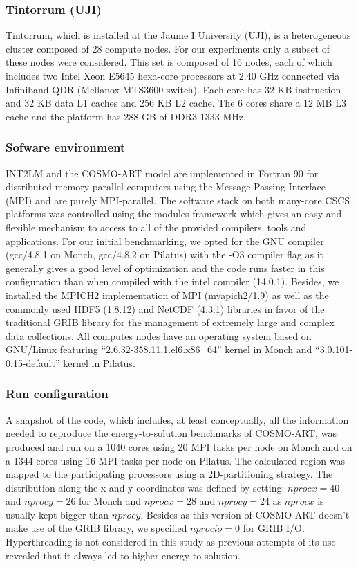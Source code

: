 \subsubsection{Tintorrum (UJI)}
Tintorrum, which  is installed at the  Jaume I University  (UJI), is a
heterogeneous  cluster   composed  of  28  compute   nodes.   For  our
experiments only a subset of  these nodes were considered. This set is
composed  of 16 nodes,  each of  which includes  two Intel  Xeon E5645
hexa-core  processors  at  2.40   GHz  connected  via  Infiniband  QDR
(Mellanox MTS3600 switch).  Each core  has 32 KB instruction and 32 KB
data L1 caches and 256 KB L2 cache. The 6 cores share a 12 MB L3 cache
and the platform has 288 GB of DDR3 1333 MHz.
 
\subsubsection{Sofware environment}
INT2LM  and the  COSMO-ART model  are  implemented in  Fortran 90  for
distributed  memory  parallel  computers  using  the  Message  Passing
Interface (MPI)  and are purely  MPI-parallel.  The software  stack on
both  many-core  CSCS  platforms  was  controlled  using  the  modules
framework which gives an easy  and flexible mechanism to access to all
of the  provided compilers, tools  and applications.  For  our initial
benchmarking,  we opted  for  the GNU  compiler  (gcc/4.8.1 on  Monch,
gcc/4.8.2 on Pilatus) with the -O3 compiler flag as it generally gives
a  good  level  of optimization  and  the  code  runs faster  in  this
configuration  than when  compiled with  the intel  compiler (14.0.1).
Besides, we installed the  MPICH2 implementation of MPI (mvapich2/1.9)
as  well  as  the  commonly  used HDF5  (1.8.12)  and  NetCDF  (4.3.1)
libraries in favor of the  traditional GRIB library for the management
of extremely  large and complex data collections.   All computes nodes
have    an   operating   system    based   on    GNU/Linux   featuring
``2.6.32-358.11.1.el6.x86\_64''      kernel      in     Monch      and
``3.0.101-0.15-default'' kernel in Pilatus.

\subsubsection{Run configuration}
A snapshot of the code, which includes, at least conceptually, all the
information needed  to reproduce the  energy-to-solution benchmarks of
COSMO-ART, was produced and run on a 1040 cores using 20 MPI tasks per
node on  Monch and  on a  1344 cores using  16 MPI  tasks per  node on
Pilatus.   The  calculated  region  was mapped  to  the  participating
processors using  a 2D-partitioning strategy.   The distribution along
the  x and  y  coordinates  was defined  by  setting: $nprocx=40$  and
$nprocy=26$ for  Monch and $nprocx=28$ and $nprocy=24$  as $nprocx$ is
usually  kept  bigger  than  $nprocy$.   Besides as  this  version  of
COSMO-ART  doesn't  make  use   of  the  GRIB  library,  we  specified
$nprocio=0$ for  GRIB I/O.  Hyperthreading  is not considered  in this
study as previous  attempts of its use revealed that  it always led to
higher energy-to-solution.\\


